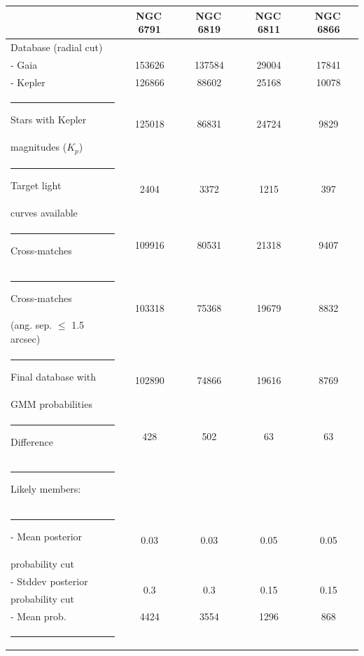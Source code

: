 \begin{table}[p]
    \centering
    \setlength\tabcolsep{11pt}
    \begin{tabular}{lcccc}
        \toprule
         & NGC\,6791 & NGC\,6819 & NGC\,6811 & NGC\,6866 \\
        \midrule
        \midrule
        Database (radial cut) &  &  &  & \\
         - Gaia  & 153626 & 137584 & 29004 & 17841 \\
         - Kepler& 126866 & 88602 & 25168 & 10078 \\\rule{-3pt}{1.2em}
        Stars with Kepler & \multirow{2}{*}{125018} & \multirow{2}{*}{86831} & \multirow{2}{*}{24724} & \multirow{2}{*}{9829} \\
        magnitudes ($K_p$) &  &  &  & \\\rule{-3pt}{1.2em}
        Target light & \multirow{2}{*}{2404} & \multirow{2}{*}{3372} & \multirow{2}{*}{1215} & \multirow{2}{*}{397} \\
        curves available &  &  &  & \\\rule{-3pt}{1.2em}
        Cross-matches & 109916 & 80531 & 21318 & 9407 \\\rule{-3pt}{1.2em}
        Cross-matches & \multirow{2}{*}{103318} & \multirow{2}{*}{75368} & \multirow{2}{*}{19679} & \multirow{2}{*}{8832} \\
        (ang. sep. $\leq$ 1.5\,arcsec) &  &  &  & \\\rule{-3pt}{1.2em}
        Final database with & \multirow{2}{*}{102890} & \multirow{2}{*}{74866} & \multirow{2}{*}{19616} & \multirow{2}{*}{8769} \\
        GMM probabilities &  &  &  & \\\midrule
        \rule{-3pt}{1.2em}
        Difference & 428 & 502 & 63 & 63 \\\midrule
        \rule{-3pt}{2em}
        Likely members: &  &  &  & \\\rule{-3pt}{1.2em}
         - Mean posterior & \multirow{2}{*}{0.03} & \multirow{2}{*}{0.03} & \multirow{2}{*}{0.05} & \multirow{2}{*}{0.05} \\
           probability cut &  &  &  & \\\rule{0pt}{1em}
         - Stddev posterior & \multirow{2}{*}{0.3} & \multirow{2}{*}{0.3} & \multirow{2}{*}{0.15} & \multirow{2}{*}{0.15} \\
           probability cut &  &  &  & \\\rule{0pt}{1em}
         - Mean prob. & 4424 & 3554 & 1296 & 868 \\\rule{-3pt}{1.2em}

\end{tabular}
\end{table}
